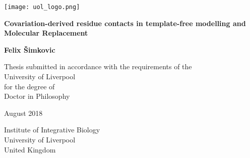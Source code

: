 \begin{titlepage}
    \begin{center}
        \vspace{1cm}
        
        \texttt{[image: uol\_logo.png]}
        
        \vspace{1cm}

        \Huge
        \textbf{Covariation-derived residue contacts in template-free modelling and Molecular Replacement}
        
        \vspace{1.5cm}
        
        \huge
        \textbf{Felix \v{S}imkovic}
        
        \vfill

        \Large
        Thesis submitted in accordance with the requirements of the \\
        University of Liverpool\\
        for the degree of\\
        Doctor in Philosophy
        
        \vspace{1.0cm}

        August 2018

        \vspace{1.0cm}
        
        \Large
        Institute of Integrative Biology\\
        University of Liverpool\\
        United Kingdom
        
    \end{center}
\end{titlepage}
